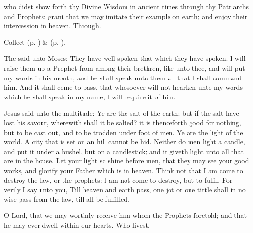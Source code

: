 \collect
{} who didst show forth thy Divine Wisdom in ancient times through thy Patriarchs and Prophets: grant that we may imitate their example on earth; and enjoy their intercession in heaven. Through.

\begin{rubric}
	 Collect  (p. \pageref{AllHallowsCollect}) \&   (p. \pageref{FourCrownedMartyrsCollect}).
\end{rubric}

 The  said unto Moses: They have well spoken that which they have spoken. I will raise them up a Prophet from among their brethren, like unto thee, and will put my words in his mouth; and he shall speak unto them all that I shall command him. And it shall come to pass, that whosoever will not hearken unto my words which he shall speak in my name, I will require it of him.



 Jesus said unto the multitude: Ye are the salt of the earth: but if the salt have lost his savour, wherewith shall it be salted? it is thenceforth good for nothing, but to be cast out, and to be trodden under foot of men. Ye are the light of the world. A city that is set on an hill cannot be hid. Neither do men light a candle, and put it under a bushel, but on a candlestick; and it giveth light unto all that are in the house. Let your light so shine before men, that they may see your good works, and glorify your Father which is in heaven. Think not that I am come to destroy the law, or the prophets: I am not come to destroy, but to fulfil. For verily I say unto you, Till heaven and earth pass, one jot or one tittle shall in no wise pass from the law, till all be fulfilled.


\secret
{} O Lord, that we may worthily receive him whom the Prophets foretold; and that he may ever dwell within our hearts. Who livest.

